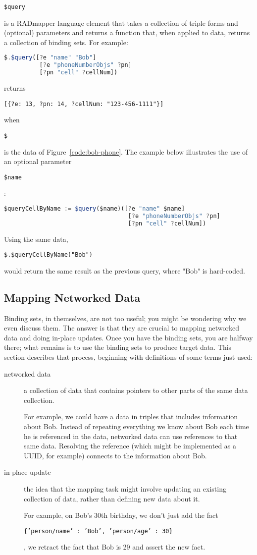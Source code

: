 \documentclass[9pt,letterpaper]{article}
\newcommand{\stt}[1]{\begin{footnotesize}\texttt{#1}\end{footnotesize}}
\begin{document}
\stt{\$query} is a RADmapper language element that takes a collection of triple forms and (optional) parameters and returns a function that, when applied to data, returns a collection of binding sets.
For example:

\begin{lstlisting}[language=JavaScript]
 $.$query([?e "name" "Bob"]
          [?e "phoneNumberObjs" ?pn]
          [?pn "cell" ?cellNum])
\end{lstlisting}

returns \stt{[\{?e: 13, ?pn: 14, ?cellNum: "123-456-1111"\}]} when \stt{\$} is the data of Figure~\ref{code:bob-phone}.
The example below illustrates the use of an optional parameter \stt{\$name}:

\begin{lstlisting}[language=JavaScript]
 $queryCellByName := $query($name)([?e "name" $name]
                                   [?e "phoneNumberObjs" ?pn]
                                   [?pn "cell" ?cellNum])
\end{lstlisting}

Using the same data, \stt{\$.\$queryCellByName("Bob")} would return the same result as the previous query, where "Bob" is hard-coded. 

\subsection{Mapping  Networked Data}

Binding sets, in themselves, are not too useful; you might be wondering why we even discuss them.
The answer is that they are crucial to mapping networked data and doing in-place updates.
Once you have the binding sets, you are halfway there; what remains is to use the binding sets to produce target data.
This section describes that process, beginning with definitions of some terms just used:

\begin{description}
\item[networked data] a collection of data that contains pointers to other parts of the same data collection.

  For example, we could have a data in triples that includes information about Bob.
  Instead of repeating everything we know about Bob each time he is referenced in the data,
  networked data can use references to that same data.
  Resolving the reference (which might be implemented as a UUID, for example) connects to the information about Bob.
\item[in-place update] the idea that the mapping task might involve updating an existing collection of data, rather than
  defining new data about it.

  For example, on Bob's 30th birthday, we don't just add the fact \stt{\{'person/name' : 'Bob', 'person/age' : 30\}}, we
  retract the fact that Bob is 29 and assert the new fact.
\end{description}
\end{document}
